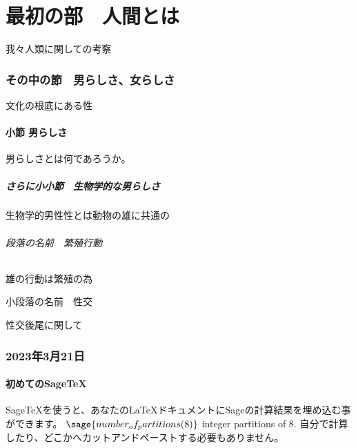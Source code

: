 \ifdefined\MainDoc
\else
    \newcommand{\MainDoc}{} %
    \ifdefined\Preamble
    \else
        
        
    \fi
\fi


\part{最初の部　人間とは}
我々人類に関しての考察

\section{その中の節　男らしさ、女らしさ}
文化の根底にある性

\subsection{小節 男らしさ}
男らしさとは何であろうか。

\subsubsection{さらに小小節　生物学的な男らしさ}
生物学的男性性とは動物の雄に共通の

\paragraph{段落の名前　繁殖行動}
雄の行動は繁殖の為

\subparagraph{小段落の名前　性交}
性交後尾に関して






\section{2023年3月21日}
\subsection{初めてのSage\TeX{}}

Sage\TeX{}を使うと、あなたの\LaTeX{}ドキュメントにSageの計算結果を埋め込む事ができます。
$\sage{number_of_partitions(8)}$ integer partitions of $8$.
自分で計算したり、どこかへカットアンドペーストする必要もありません。


